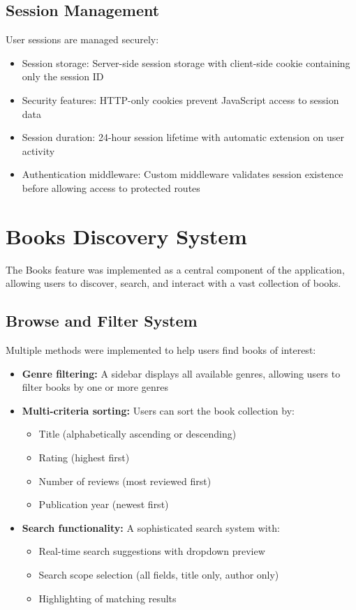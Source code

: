 \documentclass{article}
\begin{document}
\subsection{Session Management}
User sessions are managed securely:
\begin{itemize}
    \item Session storage: Server-side session storage with client-side cookie containing only the session ID
    \item Security features: HTTP-only cookies prevent JavaScript access to session data
    \item Session duration: 24-hour session lifetime with automatic extension on user activity
    \item Authentication middleware: Custom middleware validates session existence before allowing access to protected routes
\end{itemize}

\section{Books Discovery System}
The Books feature was implemented as a central component of the application, allowing users to discover, search, and interact with a vast collection of books.


\subsection{Browse and Filter System}
Multiple methods were implemented to help users find books of interest:
\begin{itemize}
    \item \textbf{Genre filtering:} A sidebar displays all available genres, allowing users to filter books by one or more genres
    \item \textbf{Multi-criteria sorting:} Users can sort the book collection by:
    \begin{itemize}
        \item Title (alphabetically ascending or descending)
        \item Rating (highest first)
        \item Number of reviews (most reviewed first)
        \item Publication year (newest first)
    \end{itemize}
    \item \textbf{Search functionality:} A sophisticated search system with:
    \begin{itemize}
        \item Real-time search suggestions with dropdown preview
        \item Search scope selection (all fields, title only, author only)
        \item Highlighting of matching results
    \end{itemize}
\end{itemize}
\end{document}
